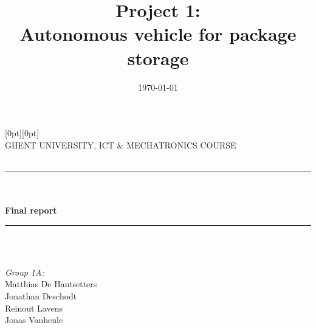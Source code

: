 \documentclass{article}
\title{Project 1: \\ Autonomous vehicle for package storage}								%
\date{\today}											%
\makeatletter
\let\thetitle\@title
\makeatother
\begin{document}
	\begin{titlepage}
		\raisebox{0 cm}[0pt][0pt]{%
			}\\[5 cm]
		\centering
		\Large GHENT UNIVERSITY, ICT \& MECHATRONICS COURSE\\
		\vspace*{0.5 cm}
		\textsc{\large }\\[0.5 cm]			%
		\rule{\linewidth}{0.2 mm} \\[0.4 cm]
		{\Large \bfseries \thetitle \\ Final report}\\
		\rule{\linewidth}{0.2 mm} \\[1.5 cm]
		\textsc{\normalsize}\\[0.5cm]
		\begin{center} \large
			\emph{Group 1A:}\\
			\Large Matthias De Hantsetters\\
			\Large Jonathan Deschodt\\
			\Large Reinout Lavens\\
			\Large Jonas Vanheule\\
			

\end{center}
\end{titlepage}
\end{document}
